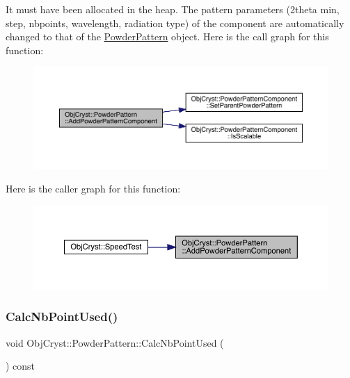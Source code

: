 It must have been allocated in the heap. The pattern parameters (2theta min, step, nbpoints, wavelength, radiation type) of the component are automatically changed to that of the \mbox{\hyperlink{class_obj_cryst_1_1_powder_pattern}{Powder\+Pattern}} object. Here is the call graph for this function\+:
\nopagebreak
\begin{figure}[H]
\begin{center}
\leavevmode
\includegraphics[width=350pt]{class_obj_cryst_1_1_powder_pattern_a0190046adad7091ca0d7818b1ced7bb2_cgraph}
\end{center}
\end{figure}
Here is the caller graph for this function\+:
\nopagebreak
\begin{figure}[H]
\begin{center}
\leavevmode
\includegraphics[width=350pt]{class_obj_cryst_1_1_powder_pattern_a0190046adad7091ca0d7818b1ced7bb2_icgraph}
\end{center}
\end{figure}
\mbox{\label{class_obj_cryst_1_1_powder_pattern_a41398431ff5bc35f99d47224c3d4a6ec}} 
\subsubsection{\texorpdfstring{CalcNbPointUsed()}{CalcNbPointUsed()}}
{\footnotesize\ttfamily void Obj\+Cryst\+::\+Powder\+Pattern\+::\+Calc\+Nb\+Point\+Used (\begin{DoxyParamCaption}{ }\end{DoxyParamCaption}) const\hspace{0.3cm}{\ttfamily [protected]}}

